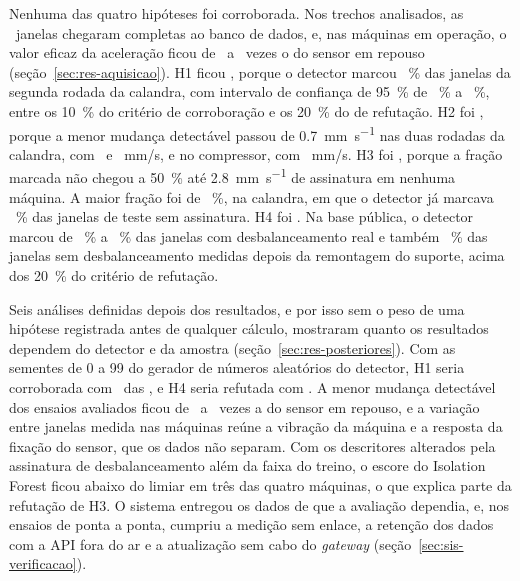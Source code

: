 Nenhuma das quatro hipóteses foi corroborada. Nos trechos analisados, as \campoJanelas\ janelas chegaram completas ao banco de dados, e, nas máquinas em operação, o valor eficaz da aceleração ficou de \sinalRazaoMin\ a \sinalRazaoMax\ vezes o do sensor em repouso (seção~\ref{sec:res-aquisicao}). H1 ficou \hUmVeredito, porque o detector marcou \hUmCalandraIFDireto~\% das janelas da segunda rodada da calandra, com intervalo de confiança de \SI{95}{\percent} de \hUmCalandraIFDiretoInf~\% a \hUmCalandraIFDiretoSup~\%, entre os \SI{10}{\percent} do critério de corroboração e os \SI{20}{\percent} do de refutação. H2 foi \hDoisVeredito, porque a menor mudança detectável passou de \SI{0,7}{\milli\meter\per\second} nas duas rodadas da calandra, com \hDoisMmdCalandraUm\ e \hDoisMmdCalandraDois~mm/s, e no compressor, com \hDoisMmdCompressorUm~mm/s. H3 foi \hTresVeredito, porque a fração marcada não chegou a \SI{50}{\percent} até \SI{2,8}{\milli\meter\per\second} de assinatura em nenhuma máquina. A maior fração foi de \hTresFracaoMaxCalandra~\%, na calandra, em que o detector já marcava \apUmFracaoSemAssinaturaCalandra~\% das janelas de teste sem assinatura. H4 foi \hQuatroVeredito. Na base pública, o detector marcou de \hQuatroFracaoTres~\% a \hQuatroFracaoQuatro~\% das janelas com desbalanceamento real e também \hQuatroFracaoZero~\% das janelas sem desbalanceamento medidas depois da remontagem do suporte, acima dos \SI{20}{\percent} do critério de refutação.

Seis análises definidas depois dos resultados, e por isso sem o peso de uma hipótese registrada antes de qualquer cálculo, mostraram quanto os resultados dependem do detector e da amostra (seção~\ref{sec:res-posteriores}). Com as sementes de 0 a \num{99} do gerador de números aleatórios do detector, H1 seria corroborada com \apTresVereditoUmCorroborada\ das \apTresSementes, e H4 seria refutada com \apTresVereditoQuatroRefutada. A menor mudança detectável dos ensaios avaliados ficou de \apCincoRazaoMin\ a \apCincoRazaoMax\ vezes a do sensor em repouso, e a variação entre janelas medida nas máquinas reúne a vibração da máquina e a resposta da fixação do sensor, que os dados não separam. Com os descritores alterados pela assinatura de desbalanceamento além da faixa do treino, o escore do Isolation Forest ficou abaixo do limiar em três das quatro máquinas, o que explica parte da refutação de H3. O sistema entregou os dados de que a avaliação dependia, e, nos ensaios de ponta a ponta, cumpriu a medição sem enlace, a retenção dos dados com a API fora do ar e a atualização sem cabo do \textit{gateway} (seção~\ref{sec:sis-verificacao}).

